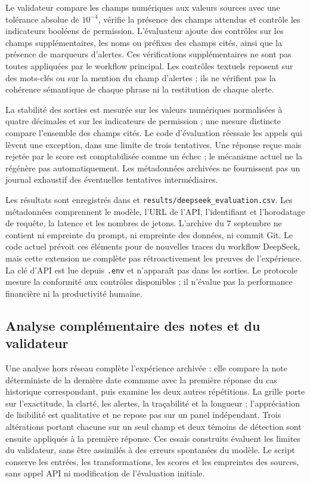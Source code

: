 Le validateur compare les champs numériques aux valeurs sources avec une tolérance absolue de $10^{-4}$, vérifie la présence des champs attendus et contrôle les indicateurs booléens de permission. L'évaluateur ajoute des contrôles sur les champs supplémentaires, les noms ou préfixes des champs cités, ainsi que la présence de marqueurs d'alertes. Ces vérifications supplémentaires ne sont pas toutes appliquées par le workflow principal. Les contrôles textuels reposent sur des mots-clés ou sur la mention du champ d'alertes ; ils ne vérifient pas la cohérence sémantique de chaque phrase ni la restitution de chaque alerte.

La stabilité des sorties est mesurée sur les valeurs numériques normalisées à quatre décimales et sur les indicateurs de permission ; une mesure distincte compare l'ensemble des champs cités. Le code d'évaluation réessaie les appels qui lèvent une exception, dans une limite de trois tentatives. Une réponse reçue mais rejetée par le score est comptabilisée comme un échec ; le mécanisme actuel ne la régénère pas automatiquement. Les métadonnées archivées ne fournissent pas un journal exhaustif des éventuelles tentatives intermédiaires.

Les résultats sont enregistrés dans  et \texttt{results/deepseek\_evaluation.csv}. Les métadonnées comprennent le modèle, l'URL de l'API, l'identifiant et l'horodatage de requête, la latence et les nombres de jetons. L'archive du 7 septembre ne contient ni empreinte du prompt, ni empreinte des données, ni commit Git. Le code actuel prévoit ces éléments pour de nouvelles traces du workflow DeepSeek, mais cette extension ne complète pas rétroactivement les preuves de l'expérience. La clé d'API est lue depuis \texttt{.env} et n'apparaît pas dans les sorties. Le protocole mesure la conformité aux contrôles disponibles ; il n'évalue pas la performance financière ni la productivité humaine.

\subsection{Analyse complémentaire des notes et du validateur}

Une analyse hors réseau complète l'expérience archivée : elle compare la note déterministe de la dernière date commune avec la première réponse du cas historique correspondant, puis examine les deux autres répétitions. La grille porte sur l'exactitude, la clarté, les alertes, la traçabilité et la longueur ; l'appréciation de lisibilité est qualitative et ne repose pas sur un panel indépendant. Trois altérations portant chacune sur un seul champ et deux témoins de détection sont ensuite appliqués à la première réponse. Ces essais construits évaluent les limites du validateur, sans être assimilés à des erreurs spontanées du modèle. Le script  conserve les entrées, les transformations, les scores et les empreintes des sources, sans appel API ni modification de l'évaluation initiale.

